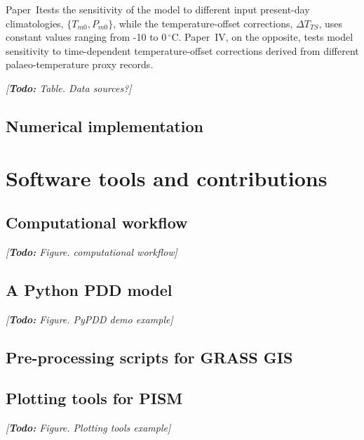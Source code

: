 \documentclass{article}
\newcommand{\todo}[1]{\emph{[\textbf{Todo:} #1]}}
\newcommand{\unit}[1]{\ensuremath{\mathrm{#1}}}
\newcommand{\degree}[0]{\ensuremath{^{\circ}}}
\newcommand{\degC}[0]{\unit{{\degree}C}}
\newcommand{\CCLI}[0]{Paper~I}      %
\newcommand{\CCYC}[0]{Paper~IV}     %
\begin{document}
\CCLI tests the sensitivity of the model to different input present-day
climatologies, $\{T_{m0}, P_{m0}\}$, while the temperature-offset corrections,
${\Delta}T_{TS}$, uses constant values ranging from -10 to 0\,\degC. \CCYC,
on the opposite, tests model sensitivity to time-dependent temperature-offset
corrections derived from different palaeo-temperature proxy records.

\todo{Table. Data sources?}

\subsection{Numerical implementation}

\section{Software tools and contributions}

\subsection{Computational workflow}
\todo{Figure. computational workflow}

\subsection{A Python PDD model}
\todo{Figure. PyPDD demo example}

\subsection{Pre-processing scripts for GRASS GIS}

\subsection{Plotting tools for PISM}
\todo{Figure. Plotting tools example}
\end{document}
